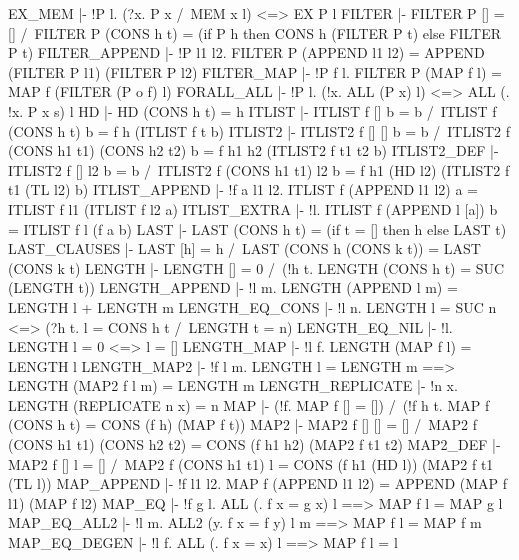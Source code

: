 \ENDTHEOREM
\THEOREM EX\_MEM
  |- !P l. (?x. P x /\ MEM x l) <=> EX P l
\ENDTHEOREM
\THEOREM FILTER
  |- FILTER P [] = [] /\
     FILTER P (CONS h t) = (if P h then CONS h (FILTER P t) else FILTER P t)
\ENDTHEOREM
\THEOREM FILTER\_APPEND
  |- !P l1 l2. FILTER P (APPEND l1 l2) = APPEND (FILTER P l1) (FILTER P l2)
\ENDTHEOREM
\THEOREM FILTER\_MAP
  |- !P f l. FILTER P (MAP f l) = MAP f (FILTER (P o f) l)
\ENDTHEOREM
\THEOREM FORALL\_ALL
  |- !P l. (!x. ALL (P x) l) <=> ALL (\s. !x. P x s) l
\ENDTHEOREM
\THEOREM HD
  |- HD (CONS h t) = h
\ENDTHEOREM
\THEOREM ITLIST
  |- ITLIST f [] b = b /\ ITLIST f (CONS h t) b = f h (ITLIST f t b)
\ENDTHEOREM
\THEOREM ITLIST2
  |- ITLIST2 f [] [] b = b /\
     ITLIST2 f (CONS h1 t1) (CONS h2 t2) b = f h1 h2 (ITLIST2 f t1 t2 b)
\ENDTHEOREM
\THEOREM ITLIST2\_DEF
  |- ITLIST2 f [] l2 b = b /\
     ITLIST2 f (CONS h1 t1) l2 b = f h1 (HD l2) (ITLIST2 f t1 (TL l2) b)
\ENDTHEOREM
\THEOREM ITLIST\_APPEND
  |- !f a l1 l2. ITLIST f (APPEND l1 l2) a = ITLIST f l1 (ITLIST f l2 a)
\ENDTHEOREM
\THEOREM ITLIST\_EXTRA
  |- !l. ITLIST f (APPEND l [a]) b = ITLIST f l (f a b)
\ENDTHEOREM
\THEOREM LAST
  |- LAST (CONS h t) = (if t = [] then h else LAST t)
\ENDTHEOREM
\THEOREM LAST\_CLAUSES
  |- LAST [h] = h /\ LAST (CONS h (CONS k t)) = LAST (CONS k t)
\ENDTHEOREM
\THEOREM LENGTH
  |- LENGTH [] = 0 /\ (!h t. LENGTH (CONS h t) = SUC (LENGTH t))
\ENDTHEOREM
\THEOREM LENGTH\_APPEND
  |- !l m. LENGTH (APPEND l m) = LENGTH l + LENGTH m
\ENDTHEOREM
\THEOREM LENGTH\_EQ\_CONS
  |- !l n. LENGTH l = SUC n <=> (?h t. l = CONS h t /\ LENGTH t = n)
\ENDTHEOREM
\THEOREM LENGTH\_EQ\_NIL
  |- !l. LENGTH l = 0 <=> l = []
\ENDTHEOREM
\THEOREM LENGTH\_MAP
  |- !l f. LENGTH (MAP f l) = LENGTH l
\ENDTHEOREM
\THEOREM LENGTH\_MAP2
  |- !f l m. LENGTH l = LENGTH m ==> LENGTH (MAP2 f l m) = LENGTH m
\ENDTHEOREM
\THEOREM LENGTH\_REPLICATE
  |- !n x. LENGTH (REPLICATE n x) = n
\ENDTHEOREM
\THEOREM MAP
  |- (!f. MAP f [] = []) /\ (!f h t. MAP f (CONS h t) = CONS (f h) (MAP f t))
\ENDTHEOREM
\THEOREM MAP2
  |- MAP2 f [] [] = [] /\
     MAP2 f (CONS h1 t1) (CONS h2 t2) = CONS (f h1 h2) (MAP2 f t1 t2)
\ENDTHEOREM
\THEOREM MAP2\_DEF
  |- MAP2 f [] l = [] /\
     MAP2 f (CONS h1 t1) l = CONS (f h1 (HD l)) (MAP2 f t1 (TL l))
\ENDTHEOREM
\THEOREM MAP\_APPEND
  |- !f l1 l2. MAP f (APPEND l1 l2) = APPEND (MAP f l1) (MAP f l2)
\ENDTHEOREM
\THEOREM MAP\_EQ
  |- !f g l. ALL (\x. f x = g x) l ==> MAP f l = MAP g l
\ENDTHEOREM
\THEOREM MAP\_EQ\_ALL2
  |- !l m. ALL2 (\x y. f x = f y) l m ==> MAP f l = MAP f m
\ENDTHEOREM
\THEOREM MAP\_EQ\_DEGEN
  |- !l f. ALL (\x. f x = x) l ==> MAP f l = l

